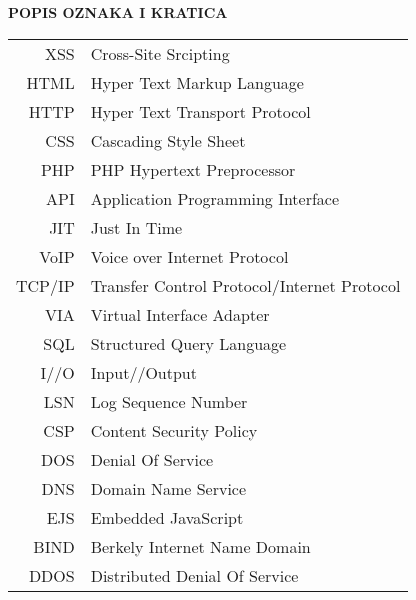 
\begin{flushleft}
{\LARGE\bf{POPIS OZNAKA I KRATICA}}

\vskip 15mm
\begin{table}[h!]
	\centering
	\begin{tabular}{r l} %
		XSS & Cross-Site Srcipting\\
		HTML & Hyper Text Markup Language\\
		HTTP & Hyper Text Transport Protocol\\
		CSS & Cascading Style Sheet\\
		PHP & PHP Hypertext Preprocessor\\
		API & Application Programming Interface\\
		JIT & Just In Time\\
		VoIP & Voice over Internet Protocol\\
		TCP/IP & Transfer Control Protocol/Internet Protocol\\
		VIA & Virtual Interface Adapter\\
		SQL & Structured Query Language\\
		I//O  & Input//Output\\
		LSN & Log Sequence Number\\
		CSP & Content Security Policy\\
		DOS & Denial Of Service\\
		DNS & Domain Name Service\\
		EJS & Embedded JavaScript\\
		BIND & Berkely Internet Name Domain\\
		DDOS & Distributed Denial Of Service\\
	\end{tabular}
\end{table}
 
\end{flushleft}
